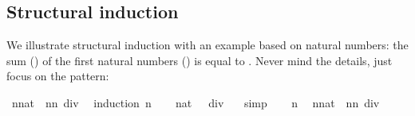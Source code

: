 \begin{isabellebody}
\begin{isamarkuptext}
\subsection{Structural induction}

We illustrate structural induction with an example based on natural numbers:
the sum () of the first  natural numbers
() is equal to \mbox{}.
Never mind the details, just focus on the pattern:%
\end{isamarkuptext}%
\isamarkuptrue%
\isamarkupfalse%
\ {}{}{}{}{}{}n{}{}nat{}\ {}\ n{}{}n{}{}{}\ div\ {}{}\isanewline
%
\isadelimproof
%
\endisadelimproof
%
\isatagproof
{}\isamarkupfalse%
\ {}induction\ n{}\isanewline
\ \ \isamarkupfalse%
\ {}{}{}{}{}{}{}{}{}nat{}\ {}\ {}{}{}{}{}{}{}\ div\ {}{}\ \isamarkupfalse%
\ simp\isanewline
{}\isamarkupfalse%
\isanewline
\ \ \isamarkupfalse%
\ n\ \isamarkupfalse%
\ {}{}{}{}{}{}n{}{}nat{}\ {}\ n{}{}n{}{}{}\ div\ {}{}\isanewline

\end{isabellebody}
